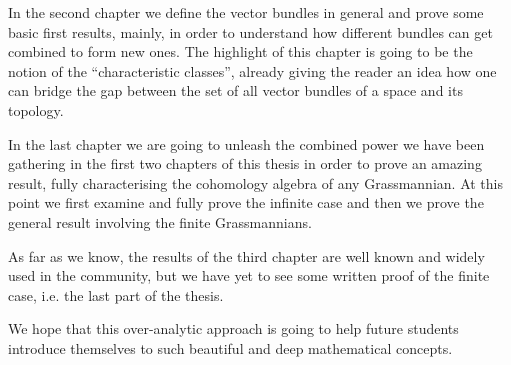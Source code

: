 In the second chapter we define the vector bundles in general and prove some basic first results, mainly, in order to understand how different bundles can get combined to form new ones. The highlight of this chapter is going to be the notion of the ``characteristic classes'', already giving the reader an idea how one can bridge the gap between the set of all vector bundles of a space and its topology.

In the last chapter we are going to unleash the combined power we have been gathering in the first two chapters of this thesis in order to prove an amazing result, fully characterising the cohomology algebra of any Grassmannian. At this point we first examine and fully prove the infinite case and then we prove the general result involving the finite Grassmannians.

As far as we know, the results of the third chapter are well known and widely used in the community, but we have yet to see some written proof of the finite case, i.e. the last part of the thesis.

We hope that this over-analytic approach is going to help future students introduce themselves to such beautiful and deep mathematical concepts.

